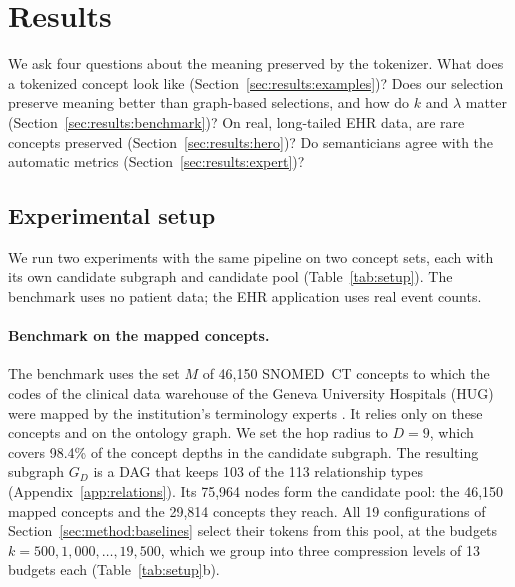 \section{Results}
\label{sec:results}

We ask four questions about the meaning preserved by the tokenizer.
What does a tokenized concept look like (Section~\ref{sec:results:examples})?
Does our selection preserve meaning better than graph-based selections, and how do $k$ and $\lambda$ matter (Section~\ref{sec:results:benchmark})?
On real, long-tailed EHR data, are rare concepts preserved (Section~\ref{sec:results:hero})?
Do semanticians agree with the automatic metrics (Section~\ref{sec:results:expert})?

\subsection{Experimental setup}
\label{sec:setup}

We run two experiments with the same pipeline on two concept sets, each with its own candidate subgraph and candidate pool (Table~\ref{tab:setup}).
The benchmark uses no patient data; the EHR application uses real event counts.

\paragraph{Benchmark on the mapped concepts.}
The benchmark uses the set $M$ of 46,150 SNOMED~CT concepts to which the codes of the clinical data warehouse of the Geneva University Hospitals (HUG) were mapped by the institution's terminology experts .
It relies only on these concepts and on the ontology graph.
We set the hop radius to $D = 9$, which covers 98.4\% of the concept depths in the candidate subgraph.
The resulting subgraph $G_D$ is a DAG that keeps 103 of the 113 relationship types (Appendix~\ref{app:relations}).
Its 75,964 nodes form the candidate pool: the 46,150 mapped concepts and the 29,814 concepts they reach.
All 19 configurations of Section~\ref{sec:method:baselines} select their tokens from this pool, at the budgets $k = 500, 1{,}000, \dots, 19{,}500$, which we group into three compression levels of 13 budgets each (Table~\ref{tab:setup}b).

